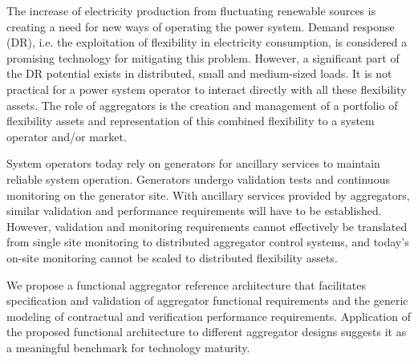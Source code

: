 The increase of electricity production from fluctuating renewable sources is creating a need for new ways of operating the power system. Demand response (DR), i.e. the exploitation of flexibility in electricity consumption, is considered a promising technology for mitigating this problem. However, a significant part of the DR potential exists in distributed, small and medium-sized loads. It is not practical for a power system operator to interact directly with all these flexibility assets. The role of aggregators is the creation and management of a portfolio of flexibility assets and  representation of this combined flexibility to a system operator and/or market.

System operators today rely on generators for ancillary services to maintain reliable system operation. Generators undergo validation tests and continuous monitoring on the generator site. With ancillary services provided by aggregators, similar validation and performance requirements will have to be established. However, validation and monitoring requirements cannot effectively be translated from single site monitoring to distributed aggregator control systems, and today's on-site monitoring cannot be scaled to distributed flexibility assets. 

We propose a functional aggregator reference architecture that facilitates specification and validation of aggregator functional requirements and the generic modeling of contractual and verification performance requirements. Application of the proposed functional architecture to  different aggregator designs suggests it as a meaningful benchmark for technology maturity.


